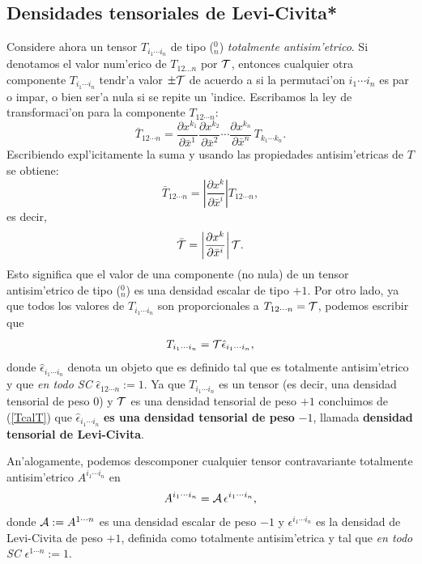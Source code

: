  \subsection{Densidades tensoriales de Levi-Civita*}
 Considere ahora un tensor $T_{i_1\cdots i_n}$ de tipo ($_n^0$)
 \textit{totalmente
 antisim'etrico}. Si denotamos el valor num'erico de $T_{12\dots n}$ por
 ${\cal T}$, entonces cualquier otra componente $T_{i_1\cdots i_n}$ tendr'a
 valor
 $\pm{\cal T}$ de acuerdo a si la permutaci'on $i_1\cdots i_n$ es par o
 impar, o
 bien ser'a nula si se repite un 'indice. Escribamos la ley de transformaci'on
 para la componente $T_{12\cdots n}$:
 \begin{equation}
 \bar{T}_{12\cdots n}=\frac{\partial
 x^{k_1}}{\partial\bar{x}^1}\frac{\partial
 x^{k_2}}{\partial\bar{x}^2}\cdots \frac{\partial x^{k_n}}{\partial\bar
 {x}^n}\,T_{k_1\cdots k_n}. \label{den8}%
 \end{equation}
 Escribiendo expl'icitamente la suma y usando las propiedades
 antisim'etricas de $T$ se obtiene:
 \begin{equation}
 \bar{T}_{12\cdots n}=\left| \frac{\partial x^k }{\partial\bar{x}^i }\right|
 T_{12\cdots n}, \label{den9}%
 \end{equation}
 es decir,
 \begin{equation}
 \bar{{\cal T}}=\left| \frac{\partial x^k }{\partial\bar{x}^i }\right| {\cal
 T}.
 \label{den10}%
 \end{equation}
 Esto significa que el valor de una componente (no nula) de un tensor
 antisim'etrico de tipo ($_n^0$) es una densidad escalar de tipo $+1$. Por
 otro lado, ya que todos los valores de $T_{i_1\cdots i_n}$ son
 proporcionales a $T_{12\cdots n}={\cal T}$, podemos escribir que
 \begin{equation}
 T_{i_1\cdots i_n}={\cal T}\hat{\epsilon}_{i_1\cdots i_n},
 \label{TcalT}
 \end{equation}
 donde $\hat{\epsilon}_{i_1\cdots i_n}$ denota un objeto que es definido
 tal que es totalmente antisim'etrico y que \textit{en todo SC}
 $\hat{\epsilon}_{12\cdots n}:=1$. Ya que $T_{i_1\cdots i_n}$ es un tensor
 (es decir, una densidad tensorial de peso $0$) y ${\cal T}$ es una densidad
 tensorial de peso $+1$ concluimos de (\ref{TcalT}) que
 $\hat{\epsilon}_{i_1\cdots i_n}$ \textbf{es una densidad tensorial de
 peso} $-1$, llamada \textbf{densidad tensorial de Levi-Civita}.

 An'alogamente, podemos descomponer cualquier tensor contravariante totalmente antisim'etrico  $A^{i_1\cdots i_n}$ en
 \begin{equation}
 A^{i_1\cdots i_n}={\cal A}\,\epsilon^{i_1\cdots i_n}, \label{AcalA}
 \end{equation}
 donde ${\cal A}:=A^{1\cdots n}$ es una densidad escalar de peso $-1$ y
 $\epsilon^{i_1\cdots i_n}$ es la densidad de Levi-Civita de peso $+1$,
 definida como totalmente antisim'etrica y tal que
 \textit{en todo SC} $\epsilon^{1\cdots n}:=1$.

